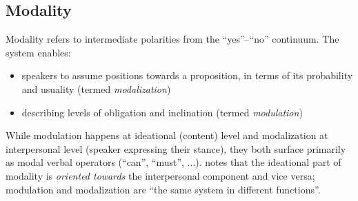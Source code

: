 \documentclass[11pt]{article}
\begin{document}
{ 	\subsection{Modality}{
 		Modality refers to intermediate polarities from the ``yes''--``no'' continuum.
 		The system enables:
 		\begin{itemize}
 			\item speakers to assume positions towards a proposition, in terms of its probability and usuality (termed \textit{modalization})
 			\item describing levels of obligation and inclination (termed \textit{modulation})
 		\end{itemize}
 		While modulation happens at ideational (content) level and modalization at interpersonal level (speaker expressing their stance), they both surface primarily as modal verbal operators (``can'', ``must'', ...). \citet{Halliday1970ModalityMood} notes that the ideational part of modality is \textit{oriented towards} the interpersonal component and vice versa; modulation and modalization are ``the same system in different functions''.
		\begin{table}[h!tb]
	      \centering
	        \begin{tabular}{l|cccccccc}

\end{tabular}
\end{table}}}
\end{document}
